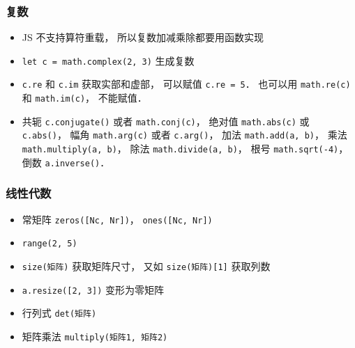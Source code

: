\subsubsection{复数}
\begin{itemize}
\item JS 不支持算符重载， 所以复数加减乘除都要用函数实现
\item \verb|let c = math.complex(2, 3)| 生成复数
\item \verb|c.re| 和 \verb|c.im| 获取实部和虚部， 可以赋值 \verb|c.re = 5|． 也可以用 \verb|math.re(c)| 和 \verb|math.im(c)|， 不能赋值．
\item 共轭 \verb|c.conjugate()| 或者 \verb|math.conj(c)|， 绝对值 \verb|math.abs(c)| 或 \verb|c.abs()|， 幅角 \verb|math.arg(c)| 或者 \verb|c.arg()|， 加法 \verb|math.add(a, b)|， 乘法 \verb|math.multiply(a, b)|， 除法 \verb|math.divide(a, b)|， 根号 \verb|math.sqrt(-4)|， 倒数 \verb|a.inverse()|．
\end{itemize}

\subsubsection{线性代数}
\begin{itemize}
\item 常矩阵 \verb|zeros([Nc, Nr])|， \verb|ones([Nc, Nr])|
\item \verb|range(2, 5)|
\item \verb|size(矩阵)| 获取矩阵尺寸， 又如 \verb|size(矩阵)[1]| 获取列数
\item \verb|a.resize([2, 3])| 变形为零矩阵
\item 行列式 \verb|det(矩阵)|
\item 矩阵乘法 \verb|multiply(矩阵1, 矩阵2)|
\end{itemize}
